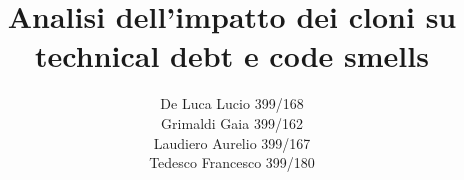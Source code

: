 \title{Analisi dell'impatto dei cloni su technical debt e code smells}
\author{De Luca Lucio 399/168\\Grimaldi Gaia 399/162\\Laudiero Aurelio  399/167\\Tedesco Francesco 399/180}
